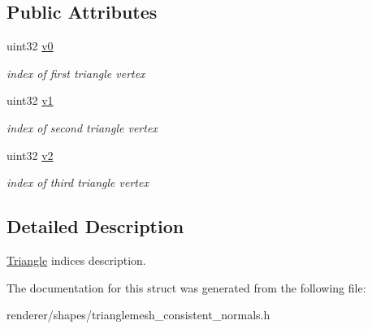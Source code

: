 \subsection*{Public Attributes}
\begin{DoxyCompactItemize}
\item 
\hypertarget{structembree_1_1_triangle_mesh_consistent_normals_1_1_triangle_adf7f8ea4a34faad6d14507bd53ac2090}{
uint32 \hyperlink{structembree_1_1_triangle_mesh_consistent_normals_1_1_triangle_adf7f8ea4a34faad6d14507bd53ac2090}{v0}}
\label{structembree_1_1_triangle_mesh_consistent_normals_1_1_triangle_adf7f8ea4a34faad6d14507bd53ac2090}

\begin{DoxyCompactList}\small\item\em index of first triangle vertex \item\end{DoxyCompactList}\item 
\hypertarget{structembree_1_1_triangle_mesh_consistent_normals_1_1_triangle_a65c34fcedc3284a963ee59a3084e2f9c}{
uint32 \hyperlink{structembree_1_1_triangle_mesh_consistent_normals_1_1_triangle_a65c34fcedc3284a963ee59a3084e2f9c}{v1}}
\label{structembree_1_1_triangle_mesh_consistent_normals_1_1_triangle_a65c34fcedc3284a963ee59a3084e2f9c}

\begin{DoxyCompactList}\small\item\em index of second triangle vertex \item\end{DoxyCompactList}\item 
\hypertarget{structembree_1_1_triangle_mesh_consistent_normals_1_1_triangle_ad13ef398454e34b5a3a2cfbd84640657}{
uint32 \hyperlink{structembree_1_1_triangle_mesh_consistent_normals_1_1_triangle_ad13ef398454e34b5a3a2cfbd84640657}{v2}}
\label{structembree_1_1_triangle_mesh_consistent_normals_1_1_triangle_ad13ef398454e34b5a3a2cfbd84640657}

\begin{DoxyCompactList}\small\item\em index of third triangle vertex \item\end{DoxyCompactList}\end{DoxyCompactItemize}


\subsection{Detailed Description}
\hyperlink{structembree_1_1_triangle_mesh_consistent_normals_1_1_triangle}{Triangle} indices description. 

The documentation for this struct was generated from the following file:\begin{DoxyCompactItemize}
\item 
renderer/shapes/trianglemesh\_\-consistent\_\-normals.h\end{DoxyCompactItemize}
